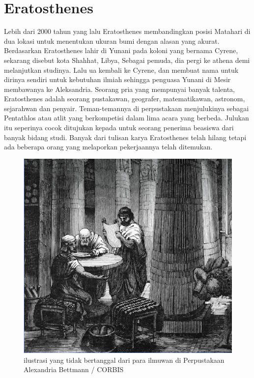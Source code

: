 
\section{Eratosthenes}
Lebih dari 2000 tahun yang lalu Eratosthenes membandingkan posisi Matahari di dua lokasi untuk menentukan ukuran bumi dengan alasan yang akurat.
Berdasarkan \cite{plochmann1983dictionary} Eratosthenes lahir di Yunani pada koloni yang bernama Cyrene, sekarang disebut kota Shahhat, Libya, Sebagai pemuda, dia  pergi ke athena demi melanjutkan studinya. Lalu ua kembali ke Cyrene, dan membuat nama untuk dirinya sendiri untuk kebutuhan ilmiah sehingga penguasa Yunani di Mesir membawanya ke Aleksandria.
Seorang pria yang mempunyai banyak talenta, Eratosthenes adalah seorang pustakawan, geografer, matematikawan, astronom, sejarahwan dan penyair. Teman-temannya di perpustakaan menjulukinya sebagai Pentathlos atau atlit yang berkompetisi dalam lima acara yang berbeda. Julukan itu seperinya cocok ditujukan kepada untuk seorang penerima beasiswa dari banyak bidang studi. Banyak dari tulisan karya Eratosthenes telah hilang tetapi ada beberapa orang yang melaporkan pekerjaannya telah ditemukan. \cite{lasky2008librarian}
\begin{figure}[ht]
	\centerline{\includegraphics[width=1\textwidth]{figures/illustrasi.jpg}}
	\caption{ilustrasi yang tidak bertanggal dari para ilmuwan di Perpustakaan Alexandria Bettmann / CORBIS}
	\label{illustrasi}
	\end{figure}
